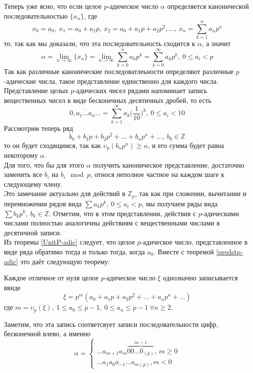 \documentclass[11pt]{report}
\begin{document}
    Теперь уже ясно, что если целое $p$-адическое число $\alpha$ определяется канонической последовательностью $\{ x_n \}$, где
    \[ x_0 = a_0, \ x_1 = a_0 + a_1 p, \ x_2 = a_0 + a_1 p + a_2 p^2, \ldots, \ x_n = \sum\limits_{k = 1}^{n} a_n p^n \]
    то, так как мы доказали, что эта последовательность сходится к $\alpha$, а значит
    \[ \alpha = \lim\limits_{n \to \infty} \{ x_n \} = \lim\limits_{n \to \infty} \sum\limits_{k = 0}^{n} a_k p^k = \sum\limits_{k = 0}^{\infty} a_k p^k, \ 0 \le a_i < p \]
    Так как различные канонические последоватлеьности определяют различные $p$-адические числа, такое представление единственно для каждого числа.
    Представление целых $p$-адических чисел рядами напоминает запись вещественных чисел в виде бесконечных десятичных дробей, то есть
    \[ \overline{0, a_1 \ldots a_n \ldots } = \sum\limits_{k = 1}^{\infty} a_k \bigg(\frac{1}{10}\bigg)^k, \ 0 \le a_i < 10 \]
    Рассмотрим теперь ряд
    \[  b_0 + b_1 p + b_2 p^2 + \ldots + b_n p^n + \ldots, \ b_0 \in \mathbb{Z} \]
    то он будет сходящимся, так как $ \upsilon_p{(b_n p^n)} \ge n$, и его сумма будет равна некоторому $\alpha$.\\

    Для того, что бы для этого $\alpha$ получить каноническое представление, достаточно заменить все $b_i$ на $b_i \mod p$, относя неполное частное на каждом шаге к следующему
    члену. \\

    Это замечание актуально для действий в $\mathbb{Z}_p$, так как при сложении, вычитании и перемножении рядов вида $\sum a_k p^k, \ 0 \le a_i < p$, мы получаем ряды
    вида $\sum b_k p^k, \ b_k \in \mathbb{Z}$.
    Отметим, что в этом представлении, действия с $p$-адическими числами полностью аналогичны действиям с вещественными числами в десятичной записи.\\

    Из теоремы \ref{UnitP-adic} следует, что целое  $p$-адическое число, представленное в виде ряда обратимо тогда и только тогда, когда $a_0$. Вместе с теоремой \ref{predstp-adic}
    это даёт следующую теорему:

    \begin{theorem}
        Каждое отличное от нуля целое $p$-адическое число $\xi$ однозначно записывается ввиде
        \[ \xi = p^m(a_0 + a_1 p + a_2 p^2 + \ldots + a_n p^n + \ldots) \]
        где $m = \upsilon_p{(\xi)}, \ 1 \le a_0 \le p - 1, \ 0 \le a_n \le p - 1 \ \forall n \ge 2$.
    \end{theorem}
    Заметим, что эта запись соответсвует записи последовательности цифр, бесконечной влево, а именно
    \[ \alpha = \begin{cases}  \ldots a_{m + 1} a_m \overbrace{00\ldots0_{(p)}}^{m - 1}, \ m \ge 0 \\
        \ldots a_1 a_0 a_{-1} \ldots a_{m(p)}, m < 0 \end{cases}\]
\end{document}
